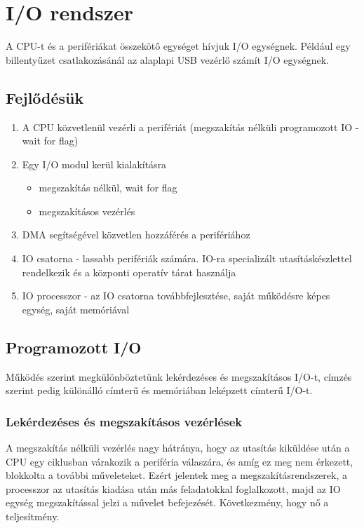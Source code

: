 
\chapter{I/O rendszer}

A CPU-t és a perifériákat összekötő egységet hívjuk I/O egységnek.
Például egy billentyűzet csatlakozásánál az alaplapi USB vezérlő számít I/O egységnek.

\section{Fejlődésük}
\begin{enumerate}
    \item A CPU közvetlenül vezérli a perifériát (megszakítás nélküli programozott IO - wait for flag)
    \item Egy I/O modul kerül kialakításra
    \begin{itemize}
        \item megszakítás nélkül, wait for flag
        \item megszakításos vezérlés
    \end{itemize}
    \item DMA segítségével közvetlen hozzáférés a perifériához
    \item IO csatorna - lassabb perifériák számára. IO-ra specializált utasításkészlettel rendelkezik és a központi operatív tárat használja
    \item IO processzor - az IO csatorna továbbfejlesztése, saját működésre képes egység, saját memóriával
\end{enumerate}

\section{Programozott I/O}
Működés szerint megkülönböztetünk lekérdezéses és megszakításos I/O-t, címzés szerint pedig különálló címterű és memóriában leképzett címterű I/O-t.

\subsection{Lekérdezéses és megszakításos vezérlések}
A megszakítás nélküli vezérlés nagy hátránya, hogy az utasítás kiküldése után a CPU egy ciklusban várakozik a periféria válaszára, és amíg ez meg nem érkezett, blokkolta a további műveleteket.
Ezért jelentek meg a megszakításrendszerek, a processzor az utasítás kiadása után más feladatokkal foglalkozott, majd az IO egység megszakítással jelzi a művelet befejezését.
Következmény, hogy nő a teljesítmény.


